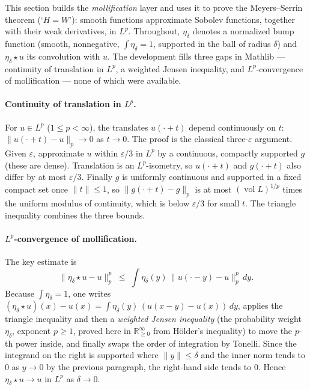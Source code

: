 ﻿\documentclass[12pt, a4paper]{article}
\renewcommand{\_}{\origunderscore\allowbreak}
\theoremstyle{definition}
\theoremstyle{plain}
\begin{document}
This section builds the \emph{mollification} layer and uses it to prove the Meyers--Serrin
theorem (`$H=W$'): smooth functions approximate Sobolev functions, together with their weak
derivatives, in $L^p$.  Throughout, $\eta_\delta$ denotes a normalized bump function (smooth,
nonnegative, $\int\eta_\delta = 1$, supported in the ball of radius $\delta$) and $\eta_\delta\star u$
its convolution with $u$.  The development fills three gaps in Mathlib --- continuity of
translation in $L^p$, a weighted Jensen inequality, and $L^p$-convergence of mollification ---
none of which were available.

\paragraph{Continuity of translation in $L^p$.}
For $u\in L^p$ ($1\le p<\infty$), the translates $u(\cdot+t)$ depend continuously on $t$:
$\|u(\cdot+t)-u\|_p \to 0$ as $t\to 0$.  The proof is the classical three-$\varepsilon$ argument.
Given $\varepsilon$, approximate $u$ within $\varepsilon/3$ in $L^p$ by a continuous, compactly
supported $g$ (these are dense).  Translation is an $L^p$-isometry, so $u(\cdot+t)$ and $g(\cdot+t)$
also differ by at most $\varepsilon/3$.  Finally $g$ is uniformly continuous and supported in a fixed
compact set once $\|t\|\le1$, so $\|g(\cdot+t)-g\|_p$ is at most $(\operatorname{vol} L)^{1/p}$ times
the uniform modulus of continuity, which is below $\varepsilon/3$ for small $t$.  The triangle
inequality combines the three bounds.

\paragraph{$L^p$-convergence of mollification.}
The key estimate is
\[
  \|\eta_\delta\star u - u\|_p^p \;\le\; \int \eta_\delta(y)\,\|u(\cdot - y) - u\|_p^p \, dy .
\]
Because $\int\eta_\delta = 1$, one writes $(\eta_\delta\star u)(x) - u(x) = \int \eta_\delta(y)\,(u(x-y)-u(x))\,dy$,
applies the triangle inequality and then a \emph{weighted Jensen inequality} (the probability
weight $\eta_\delta$, exponent $p\ge1$, proved here in $\mathbb{R}_{\ge0}^\infty$ from Hölder's
inequality) to move the $p$-th power inside, and finally swaps the order of integration by Tonelli.
Since the integrand on the right is supported where $\|y\|\le\delta$ and the inner norm tends to $0$
as $y\to0$ by the previous paragraph, the right-hand side tends to $0$.  Hence
$\eta_\delta\star u \to u$ in $L^p$ as $\delta\to0$.
\end{document}
